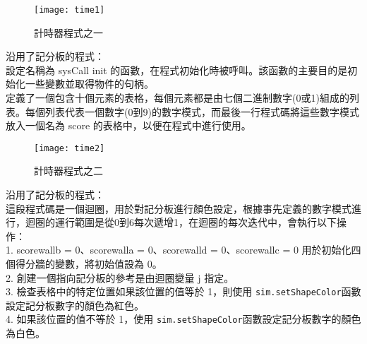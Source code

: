 \begin{figure}[hbt!]
\begin{center}
\texttt{[image: time1]}
\caption{\Large 計時器程式之一}\label{計時器程式之一}
\end{center}
\end{figure} 
沿用了記分板的程式：\\
設定名稱為 sysCall init 的函數，在程式初始化時被呼叫。該函數的主要目的是初始化一些變數並取得物件的句柄。\\定義了一個包含十個元素的表格，每個元素都是由七個二進制數字(0或1)組成的列表。每個列表代表一個數字(0到9)的數字模式，而最後一行程式碼將這些數字模式放入一個名為 score 的表格中，以便在程式中進行使用。\\
\newpage

\begin{figure}[hbt!]
\begin{center}
\texttt{[image: time2]}
\caption{\Large 計時器程式之二}\label{計時器程式之二}
\end{center}
\end{figure} 
沿用了記分板的程式：\\
這段程式碼是一個迴圈，用於對記分板進行顏色設定，根據事先定義的數字模式進行，迴圈的運行範圍是從0到6每次遞增1，在迴圈的每次迭代中，會執行以下操作：\\
1. scorewallb = 0、scorewalla = 0、scorewalld = 0、scorewallc = 0 用於初始化四個得分牆的變數，將初始值設為 0。\\
2. 創建一個指向記分板的參考是由迴圈變量 j 指定。\\
3. 檢查表格中的特定位置如果該位置的值等於 1，則使用 \texttt{sim.setShapeColor}函數設定記分板數字的顏色為紅色。\\
4. 如果該位置的值不等於 1，使用 \texttt{sim.setShapeColor}函數設定記分板數字的顏色為白色。\\
\newpage


